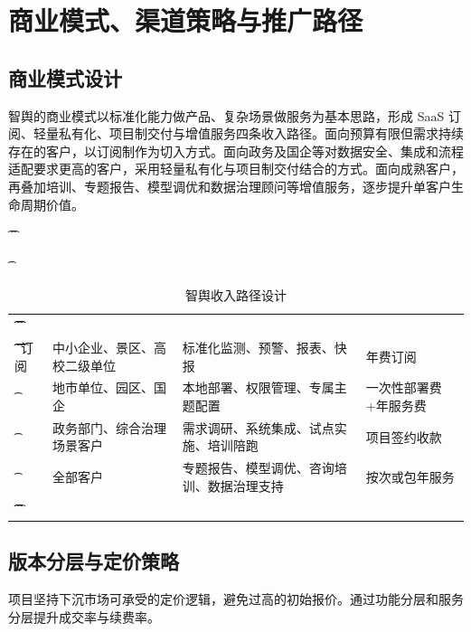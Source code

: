 \chapter{商业模式、渠道策略与推广路径}

\section{商业模式设计}

智舆的商业模式以标准化能力做产品、复杂场景做服务为基本思路，形成 SaaS 订阅、轻量私有化、项目制交付与增值服务四条收入路径。面向预算有限但需求持续存在的客户，以订阅制作为切入方式。面向政务及国企等对数据安全、集成和流程适配要求更高的客户，采用轻量私有化与项目制交付结合的方式。面向成熟客户，再叠加培训、专题报告、模型调优和数据治理顾问等增值服务，逐步提升单客户生命周期价值。

\begin{table}[htbp]
	\t\centering
	\t\caption{智舆收入路径设计}
	\t\begin{tabularx}{\textwidth}{|L{2.8cm}L{3cm}YL{2.5cm}|}
		\t\t\toprule
		\t\t{} &  &         &  \\
		\t\t\midrule
		\t\t{}
		\t\tSaaS 订阅        & 中小企业、景区、高校二级单位 & 标准化监测、预警、报表、快报        & 年费订阅           \\
		\t{}          & 地市单位、园区、国企     & 本地部署、权限管理、专属主题配置      & 一次性部署费+年服务费    \\
		\t{}          & 政务部门、综合治理场景客户  & 需求调研、系统集成、试点实施、培训陪跑   & 项目签约收款         \\
		\t{}           & 全部客户           & 专题报告、模型调优、咨询培训、数据治理支持 & 按次或包年服务        \\
		\t\t\bottomrule
		\t\end{tabularx}
\end{table}

\section{版本分层与定价策略}

项目坚持下沉市场可承受的定价逻辑，避免过高的初始报价。通过功能分层和服务分层提升成交率与续费率。

